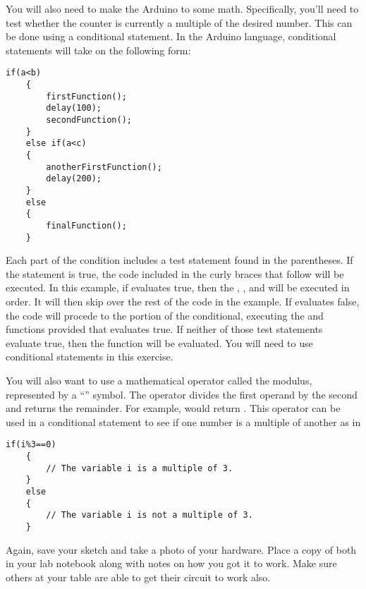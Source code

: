 You will also need to make the Arduino to some math. Specifically, you'll need
to test whether the counter is currently a multiple of the desired number.
This can be done using a conditional statement. In the Arduino language, 
conditional statements will take on the following form:
\begin{lstlisting}[language=Arduino] 
    if(a<b)
    {
        firstFunction();
        delay(100);
        secondFunction();
    }
    else if(a<c)
    {
        anotherFirstFunction();
        delay(200);
    }
    else
    {
        finalFunction();
    }
\end{lstlisting}
Each part of the condition includes a test statement found in the parentheses.
If the statement is true, the code included in the curly braces that follow
will be executed. In this example, if  evaluates true, then the
, , and  will be 
executed in order. It will then skip over the rest of the code in the example.
If  evaluates false, the code will procede to the 
portion of the conditional, executing the  and 
 functions provided that  evaluates true. If neither
of those test statements evaluate true, then the  function
will be evaluated. You will need to use conditional statements in this exercise.

You will also want to use a mathematical operator called the modulus,
represented by a ``\code{\%}'' symbol. The operator divides the first operand
by the second and returns the remainder. For example,  would 
return . This operator can be used in a conditional statement to see
if one number is a multiple of another as in
\begin{lstlisting}[language=Arduino] 
    if(i%3==0)
    {
        // The variable i is a multiple of 3.
    }
    else
    {
        // The variable i is not a multiple of 3.
    }
\end{lstlisting}

Again, save your sketch and take a photo of 
your hardware. Place a copy of 
both in your lab notebook along with notes on how you got it to work. Make
sure others at your table are able to get their circuit to work also.


